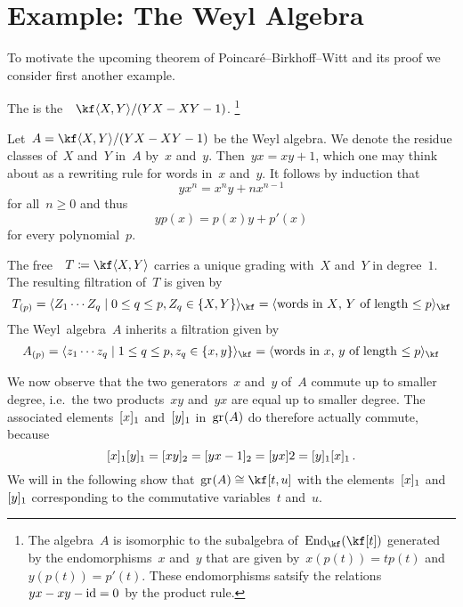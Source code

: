 \section{Example: The Weyl Algebra}


\begin{fluff}
  To motivate the upcoming theorem of Poincaré--Birkhoff--Witt and its proof we consider first another example.
\end{fluff}


\begin{definition}
  The  is the~\algebra{$\kf$}~$\kf\gen{X, Y} / \ideal{YX - XY - 1}$.%
  \footnote{The algebra~$A$ is isomorphic to the subalgebra of~$\End_{\kf}(\kf[t])$ generated by the endomorphisms~$x$ and~$y$ that are given by~$x(p(t)) = t p(t)$ and~$y(p(t)) = p'(t)$.
  These endomorphisms satsify the relations~$yx - xy - \mathrm{id} = 0$ by the product rule.}
\end{definition}


\begin{fluff}
  \label{filtration on the weyl algebra}
  Let~$A = \kf\gen{X,Y} / \ideal{YX - XY - 1}$ be the Weyl algebra.
  We denote the residue classes of~$X$ and~$Y$ in~$A$ by~$x$ and~$y$.
  Then~$yx = xy + 1$, which one may think about as a rewriting rule for words in~$x$ and~$y$.
  It follows by induction that
  \[
    y x^n
    =
    x^n y + n x^{n-1}
  \]
  for all~$n \geq 0$ and thus
  \[
    y p(x)
    =
    p(x) y + p'(x)
  \]
  for every polynomial~$p$.
  
  The free~{\algebra{$\kf$}}~$T \defined \kf\gen{X, Y}$ carries a unique grading with~$X$ and~$Y$ in degree~$1$.
  The resulting filtration of~$T$ is given by
  \[
    T_{(p)}
    =
    \gen{
      Z_1 \dotsm Z_q
    \suchthat
      0 \leq q \leq p,
      Z_q \in \{X, Y\}
    }_{\kf}
    =
    \gen{
      \text{words in~$X$,~$Y$ of length~$\leq p$}
    }_{\kf}
  \]
  The Weyl~algebra~$A$ inherits a filtration given by
  \begin{align*}
    A_{(p)}
    =
    \gen{
      z_1 \dotsm z_q
    \suchthat
      1 \leq q \leq p,
      z_q \in \{x, y\}
    }_{\kf}
    =
    \gen{
      \text{words in~$x$,~$y$ of length~$\leq p$}
    }_{\kf}
  \end{align*}
  
  We now observe that the two generators~$x$ and~$y$ of~$A$ commute up to smaller degree, i.e.\ the two products~$xy$ and~$yx$ are equal up to smaller degree.
  The associated elements~$\lbrack x\rbrack_1$ and~$\lbrack y\rbrack_1$ in~$\gr(A)$ do therefore actually commute, because
  \[
    \lbrack x\rbrack_1 \lbrack y\rbrack_1
    =
    \lbrack xy\rbrack_2
    =
    \lbrack yx - 1\rbrack_2
    =
    \lbrack yx \rbrack2
    =
    \lbrack y\rbrack_1 \lbrack x\rbrack_1 \,.
  \]
  We will in the following show that~$\gr(A) \cong \kf[t,u]$ with the elements~$\lbrack x\rbrack_1$ and~$\lbrack y\rbrack_1$ corresponding to the commutative variables~$t$ and~$u$.
\end{fluff}


